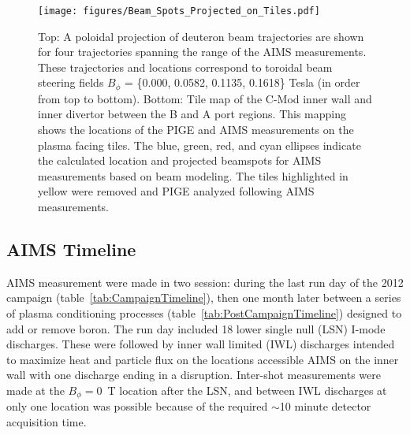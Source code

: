 \documentclass[final,3p,times,twocolumn]{elsarticle}
\begin{document}
\begin{figure}[!h]
 \centering
  \texttt{[image: figures/Beam\_Spots\_Projected\_on\_Tiles.pdf]}
 \caption{\small Top: A poloidal projection of deuteron beam trajectories are shown for four trajectories spanning the range of the AIMS measurements. These trajectories and locations correspond to toroidal beam steering fields $B_\phi$ = \{0.000, 0.0582, 0.1135, 0.1618\} Tesla (in order from top to bottom). Bottom: Tile map of the C-Mod inner wall and inner divertor between the B and A port regions. This mapping shows the locations of the PIGE and AIMS measurements on the plasma facing tiles. The blue, green, red, and cyan ellipses indicate the calculated location and projected beamspots for AIMS measurements based on beam modeling. The tiles highlighted in yellow were removed and PIGE analyzed following AIMS measurements.}
 \label{fig:TileMap0}
\end{figure}



\subsection{AIMS Timeline}

AIMS measurement were made in two session: during the last run day of the 2012 campaign (table~\ref{tab:CampaignTimeline}), then one month later between a series of plasma conditioning processes (table~\ref{tab:PostCampaignTimeline}) designed to add or remove boron. The run day included 18 lower single null (LSN) I-mode discharges. These were followed by inner wall limited (IWL) discharges intended to maximize heat and particle flux on the locations accessible AIMS on the inner wall with one discharge ending in a disruption. Inter-shot measurements were made at the $B_\phi = 0$~T location after the LSN, and between IWL discharges at only one location was possible because of the required $\sim$10 minute detector acquisition time.
\end{document}
